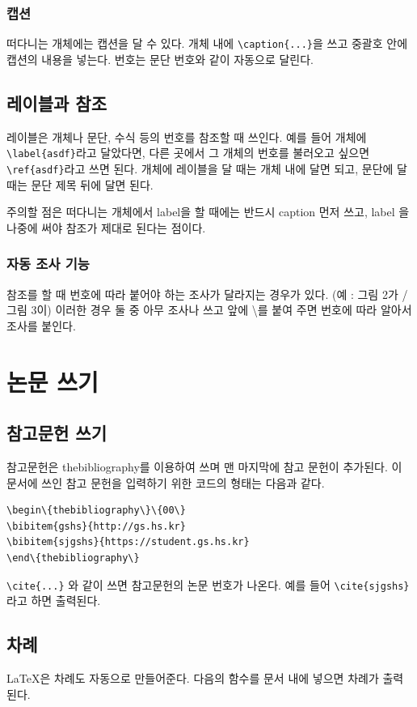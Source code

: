 \documentclass[11pt]{article}
\begin{document}
\subsubsection{캡션}
떠다니는 개체에는 캡션을 달 수 있다. 개체 내에 \verb|\caption{...}|을 쓰고 
중괄호 안에 캡션의 내용을 넣는다. 번호는 문단 번호와 같이 자동으로 달린다.

\subsection{레이블과 참조}
레이블은 개체나 문단, 수식 등의 번호를 참조할 때 쓰인다. 예를 들어 개체에
\verb|\label{asdf}|라고 달았다면, 다른 곳에서 그 개체의 번호를 불러오고 싶으면
\verb|\ref{asdf}|라고 쓰면 된다.
개체에 레이블을 달 때는 개체 내에 달면 되고, 문단에 달 때는 문단 제목 뒤에 달면 
된다.

주의할 점은 떠다니는 개체에서 label을 할 때에는 반드시 caption 먼저 쓰고, label 
을 나중에 써야 참조가 제대로 된다는 점이다.

\subsubsection{자동 조사 기능}
참조를 할 때 번호에 따라 붙어야 하는 조사가 달라지는 경우가 있다. (예 : 그림 
2가 / 그림 3이) 이러한 경우 둘 중 아무 조사나 쓰고 앞에 \textbackslash 를 붙여 
주면 번호에 따라 알아서 조사를 붙인다.

\section{논문 쓰기}

\subsection{참고문헌 쓰기}
참고문헌은 thebibliography를 이용하여 쓰며 맨 마지막에 참고 문헌이 추가된다. 
이 문서에 쓰인 참고 문헌을 입력하기 위한 코드의 형태는 다음과 같다.
\begin{verbatim}
\begin\{thebibliography\}\{00\}
\bibitem{gshs}{http://gs.hs.kr}
\bibitem{sjgshs}{https://student.gs.hs.kr}
\end\{thebibliography\}
\end{verbatim}
\verb|\cite{...}| 와 같이 쓰면 참고문헌의 논문 번호가 나온다. 예를 들어
\verb|\cite{sjgshs}|라고 하면 \cite{sjgshs}\이 출력된다.


\subsection{차례}
\LaTeX 은 차례도 자동으로 만들어준다. 다음의 함수를 문서 내에 넣으면 차례가 
출력된다.
\end{document}
